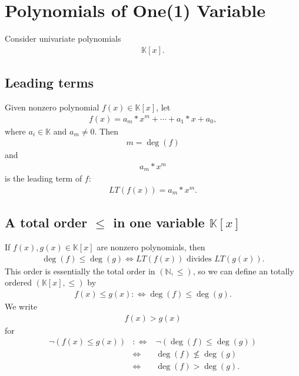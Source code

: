 \documentclass[11pt]{book}
\begin{document}
\section{Polynomials of One(1) Variable}
Consider univariate polynomials
\begin{eqnarray}
\mathbb{K}[x].
\end{eqnarray}

\subsection{Leading terms}
Given nonzero polynomial $f(x) \in \mathbb{K}[x]$, let
\begin{eqnarray}
f(x) = a_m * x^m + \cdots + a_1 * x + a_0,
\end{eqnarray}
where $a_i \in \mathbb{K}$ and $a_m \neq 0$.
Then
\begin{eqnarray}
m = \deg(f)
\end{eqnarray}
and
\begin{eqnarray}
a_m * x^m
\end{eqnarray}
is the leading term of $f$:
\begin{eqnarray}
LT\left(f(x) \right) = a_m * x^m.
\end{eqnarray}

\subsection{A total order $\leq$ in one variable $ \mathbb{K}[x]$ }
If $f(x), g(x) \in \mathbb{K}[x]$ are nonzero polynomials, then
\begin{eqnarray}
\deg(f) \leq \deg(g) \Leftrightarrow LT\left(f(x) \right) \text{ divides } LT\left(g(x) \right).
\end{eqnarray}
This order is essentially the total order in $(\mathbb{N}, \leq)$, so we can define an totally ordered $(\mathbb{K}[x], \leq)$ by
\begin{eqnarray}
f(x) \leq g(x) :\Leftrightarrow \deg(f) \leq \deg(g).
\end{eqnarray}
We write
\begin{eqnarray}
f(x) > g(x)
\end{eqnarray}
for
\begin{eqnarray}
\lnot\left( f(x) \leq g(x) \right) &:\Leftrightarrow& \lnot\left( \deg(f) \leq \deg(g) \right) \\
&\Leftrightarrow&  \deg(f) \not\leq \deg(g) \\
&\Leftrightarrow&  \deg(f) > \deg(g).
\end{eqnarray}
\end{document}
